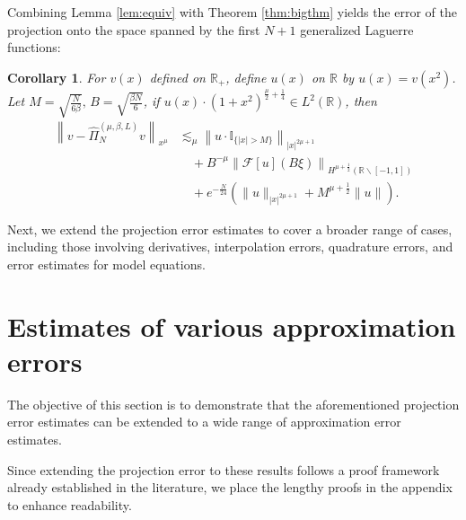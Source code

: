 \documentclass[pdflatex,sn-aps]{sn-jnl}%
\theoremstyle{thmstyleone}%
\newtheorem{corollary}{Corollary}[section]
\theoremstyle{thmstyletwo}%
\theoremstyle{thmstylethree}%
\begin{document}
Combining Lemma \ref{lem:equiv} with Theorem \ref{thm:bigthm} yields the 
error of the projection onto the space spanned by the first 
$N+1$ generalized Laguerre functions:
\begin{corollary}\label{cor:Laguerre-proj}
  For $v(x)$ defined on $\mathbb{R}_+$, define $u(x)$
  on $\mathbb{R}$ by $u(x)= v(x^2)$. Let $M = \sqrt{\frac{N}{6\beta}},\, B = \sqrt{\frac{\beta N}{6}}$,
  if $u(x) \cdot (1+x^2)^{\frac{\mu}{2}+\frac{1}{4}} \in L^2\left(\mathbb{R}\right)$, then
  \begin{equation}\label{eq:1111-10}
    \begin{aligned}
    \left\|v-\widehat{\Pi}_N^{(\mu, \beta, L)} v\right\|_{x^\mu} & \lesssim_\mu\left\|u \cdot \mathbb{I}_{\{|x|>M\}}\right\|_{|x|^{2 \mu + 1}} \\
    &{}\quad +B^{-\mu}\left\|\mathcal{F}[u](B \xi)\right\|_{H^{\mu+\frac{1}{2}}(\mathbb{R} \backslash [-1,1])} \\
    &{}\quad +e^{-\frac{N}{24}}\left(\|u\|_{|x|^{2 \mu+1}}+M^{\mu+\frac{1}{2}}\|u\|\right).
    \end{aligned}
  \end{equation}
\end{corollary}

Next, we extend the projection error estimates to cover a broader range of cases, including those involving derivatives, interpolation errors, quadrature errors, and error estimates for model equations.

\section{Estimates of various approximation errors}
\label{sec:general}
The objective of this section is to demonstrate that the aforementioned projection error estimates can be extended to a wide range of approximation error estimates.

Since extending the projection error to these results follows a proof framework already established in the literature, we place the lengthy proofs in the appendix to enhance readability. 
\end{document}
